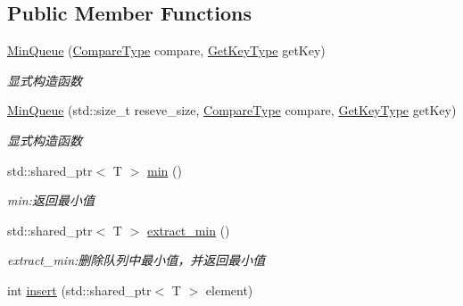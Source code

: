 \subsection*{Public Member Functions}
\begin{DoxyCompactItemize}
\item 
\hyperlink{class_introduction_to_algorithm_1_1_queue_algorithm_1_1_min_queue_a98e54e4e2c19918032b09e23e79a25e5}{Min\+Queue} (\hyperlink{class_introduction_to_algorithm_1_1_queue_algorithm_1_1_min_queue_a8f2f5b5d2b7097bbc6edda7b9c9228a6}{Compare\+Type} compare, \hyperlink{class_introduction_to_algorithm_1_1_queue_algorithm_1_1_min_queue_a391cb754ab172d1d4cdefd34130b917c}{Get\+Key\+Type} get\+Key)
\begin{DoxyCompactList}\small\item\em 显式构造函数 \end{DoxyCompactList}\item 
\hyperlink{class_introduction_to_algorithm_1_1_queue_algorithm_1_1_min_queue_a770243b2227a15bdc2105dde6549c745}{Min\+Queue} (std\+::size\+\_\+t reseve\+\_\+size, \hyperlink{class_introduction_to_algorithm_1_1_queue_algorithm_1_1_min_queue_a8f2f5b5d2b7097bbc6edda7b9c9228a6}{Compare\+Type} compare, \hyperlink{class_introduction_to_algorithm_1_1_queue_algorithm_1_1_min_queue_a391cb754ab172d1d4cdefd34130b917c}{Get\+Key\+Type} get\+Key)
\begin{DoxyCompactList}\small\item\em 显式构造函数 \end{DoxyCompactList}\item 
std\+::shared\+\_\+ptr$<$ T $>$ \hyperlink{class_introduction_to_algorithm_1_1_queue_algorithm_1_1_min_queue_a96293074ee6adef713e9e47059958ea2}{min} ()
\begin{DoxyCompactList}\small\item\em min\+:返回最小值 \end{DoxyCompactList}\item 
std\+::shared\+\_\+ptr$<$ T $>$ \hyperlink{class_introduction_to_algorithm_1_1_queue_algorithm_1_1_min_queue_a71022b9e1e9993ec5c5876da9e6e6eee}{extract\+\_\+min} ()
\begin{DoxyCompactList}\small\item\em extract\+\_\+min\+:删除队列中最小值，并返回最小值 \end{DoxyCompactList}\item 
int \hyperlink{class_introduction_to_algorithm_1_1_queue_algorithm_1_1_min_queue_a0992696959d7300082654529becd1765}{insert} (std\+::shared\+\_\+ptr$<$ T $>$ element)

\end{DoxyCompactItemize}
